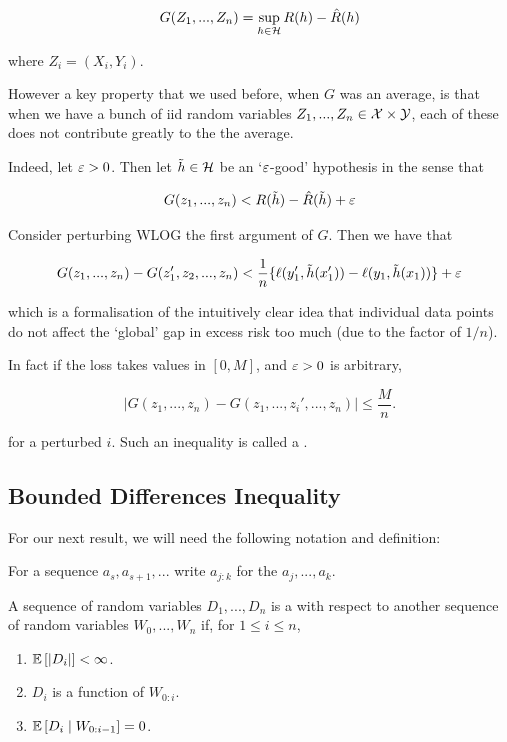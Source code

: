\documentclass[11pt]{scrartcl}
\begin{document}
\begin{equation}
    G(Z_1, ... , Z_n) = \sup_{h \in \mathcal{H}} R(h) - \hat{R}(h)
\label{G definition}
\end{equation}

where $Z_i = (X_i, Y_i)$.

However a key property that we used before, when $G$ was an average, is that when we have a bunch of iid random variables $Z_1, ... , Z_n \in \mathcal{X} \times \mathcal{Y}$, each of these does not contribute greatly to the the average. 

Indeed, let $\varepsilon > 0$. Then let $\tilde{h} \in \mathcal{H}$ be an `$\varepsilon$-good' hypothesis in the sense that 

\begin{equation}
    G(z_1, ... , z_n) < R(\tilde{h}) - \hat{R}(\tilde{h}) + \varepsilon
\end{equation}

Consider perturbing WLOG the first argument of $G$. Then we have that

\begin{equation}
    G(z_1, ... , z_n) - G(z_1', z_2, ... , z_n) < \frac1n \{ \ell(y_1', \tilde{h}(x_1')) - \ell(y_1, \tilde{h}(x_1)) \} + \varepsilon
\end{equation}

which is a formalisation of the intuitively clear idea that individual data points do not affect the `global' gap in excess risk too much (due to the factor of $1/n$).

In fact if the loss takes values in $[0, M ]$, and $\varepsilon > 0$ is arbitrary, %

\begin{equation}
    | G(z_1, ... , z_n) - G(z_1, ... , z_i', ... , z_n)| \le \frac{M}{n}.
\label{G perturb bounded diff prop}
\end{equation}

for a perturbed $i$. Such an inequality is called a .

\subsection{Bounded Differences Inequality}

For our next result, we will need the following notation and definition:

For a sequence $a_s, a_{s+1}, ... $ write $a_{j:k}$ for the  $a_j, ... , a_k$.

\begin{definition}
A sequence of random variables $D_1, ... , D_n$ is a  with respect to another sequence of random variables $W_0, ... , W_n$ if, for $1 \le i \le n$,
\begin{enumerate}
    \item $\mathbb{E} \left[ |D_i| \right] < \infty$.
    \item $D_i$ is a function of $W_{0:i}$.
    \item $\mathbb{E} \left[ D_i \mid W_{0:i-1} \right] = 0$.
\end{enumerate}
\end{definition}
\end{document}

